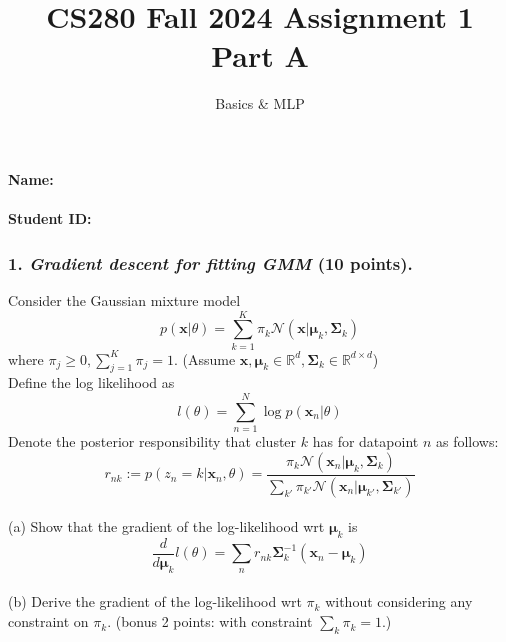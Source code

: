 \documentclass[12pt]{article}%
\begin{document}
\title{CS280 Fall 2024 Assignment 1 \\ Part A}
\author{Basics \& MLP}
\maketitle

\paragraph{Name:}

\paragraph{Student ID:}

\newpage


\subsubsection*{1. \textit{Gradient descent for fitting GMM} (10 points).}
Consider the Gaussian mixture model
\[p(\mathbf{x}|\theta)=\sum_{k=1}^K \pi_k \mathcal{N}(\mathbf{x}|\boldsymbol{\mu}_k,\boldsymbol{\Sigma}_k)\]
\indent where $\pi_j\geq 0, \sum_{j=1}^K\pi_j = 1$. (Assume $\mathbf{x},\boldsymbol{\mu}_k\in \mathbb{R}^d,\boldsymbol{\Sigma}_k\in \mathbb{R}^{d\times d}$)
\vspace{1em}
\\
 Define the log likelihood as
\[ l(\theta) = \sum_{n=1}^N \log p(\mathbf{x}_n|\theta)
\]
 Denote the posterior responsibility that cluster $k$ has for datapoint $n$ as follows:
\[
r_{nk}:=p(z_n=k|\mathbf{x}_n,\theta) = \frac{\pi_k\mathcal{N}(\mathbf{x}_n|\boldsymbol{\mu}_k,\boldsymbol{\Sigma}_k)}{\sum_{k'}\pi_{k'}\mathcal{N}(\mathbf{x}_n|\boldsymbol{\mu}_{k'},\boldsymbol{\Sigma}_{k'})}
\]
\\
(a) Show that the gradient of the log-likelihood wrt $\boldsymbol{\mu}_k$ is
	\[ \frac{d}{d\boldsymbol{\mu}_k}l(\theta) = \sum_n r_{nk}\boldsymbol{\Sigma}_k^{-1}(\mathbf{x}_n-\boldsymbol{\mu}_k)
	\]
	\\
	(b) Derive the gradient of the log-likelihood wrt $\pi_k$ without considering any constraint on $\pi_k$. (bonus 2 points: with constraint $\sum_k\pi_k=1$.)
\pagebreak
\end{document}
